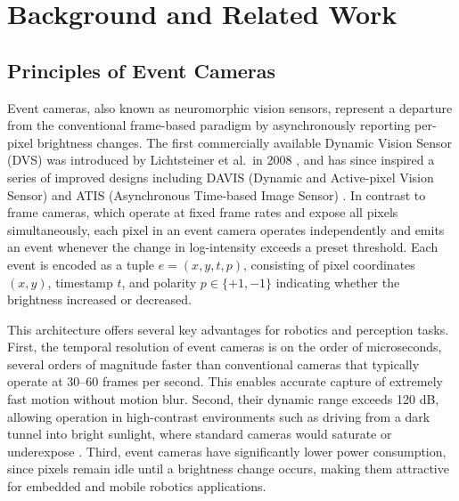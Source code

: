 \chapter{Background and Related Work}\label{chap:background}

\section{Principles of Event Cameras}

Event cameras, also known as neuromorphic vision sensors, represent a departure from the conventional frame-based paradigm by asynchronously reporting per-pixel brightness changes. The first commercially available Dynamic Vision Sensor (DVS) was introduced by Lichtsteiner et al.\ in 2008 \cite{Lichtsteiner2008}, and has since inspired a series of improved designs including DAVIS (Dynamic and Active-pixel Vision Sensor) \cite{Brandli2014} and ATIS (Asynchronous Time-based Image Sensor) \cite{Posch2014}. In contrast to frame cameras, which operate at fixed frame rates and expose all pixels simultaneously, each pixel in an event camera operates independently and emits an event whenever the change in log-intensity exceeds a preset threshold. Each event is encoded as a tuple $e=(x,y,t,p)$, consisting of pixel coordinates $(x,y)$, timestamp $t$, and polarity $p \in \{+1,-1\}$ indicating whether the brightness increased or decreased.

This architecture offers several key advantages for robotics and perception tasks. First, the temporal resolution of event cameras is on the order of microseconds, several orders of magnitude faster than conventional cameras that typically operate at 30–60 frames per second. This enables accurate capture of extremely fast motion without motion blur. Second, their dynamic range exceeds 120 dB, allowing operation in high-contrast environments such as driving from a dark tunnel into bright sunlight, where standard cameras would saturate or underexpose \cite{Gallego2020Survey}. Third, event cameras have significantly lower power consumption, since pixels remain idle until a brightness change occurs, making them attractive for embedded and mobile robotics applications.

